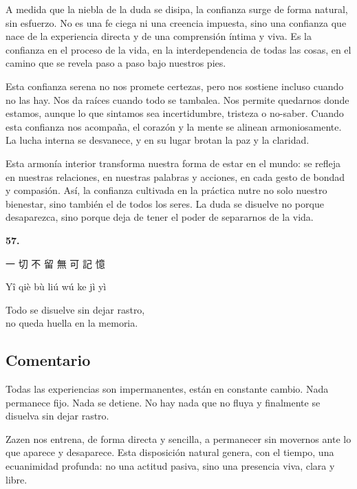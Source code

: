 \documentclass[
  a5paperpaper,
]{article}
\begin{document}
A medida que la niebla de la duda se disipa, la confianza surge de forma
natural, sin esfuerzo. No es una fe ciega ni una creencia impuesta, sino
una confianza que nace de la experiencia directa y de una comprensión
íntima y viva. Es la confianza en el proceso de la vida, en la
interdependencia de todas las cosas, en el camino que se revela paso a
paso bajo nuestros pies.

Esta confianza serena no nos promete certezas, pero nos sostiene incluso
cuando no las hay. Nos da raíces cuando todo se tambalea. Nos permite
quedarnos donde estamos, aunque lo que sintamos sea incertidumbre,
tristeza o no-saber. Cuando esta confianza nos acompaña, el corazón y la
mente se alinean armoniosamente. La lucha interna se desvanece, y en su
lugar brotan la paz y la claridad.

Esta armonía interior transforma nuestra forma de estar en el mundo: se
refleja en nuestras relaciones, en nuestras palabras y acciones, en cada
gesto de bondad y compasión. Así, la confianza cultivada en la práctica
nutre no solo nuestro bienestar, sino también el de todos los seres. La
duda se disuelve no porque desaparezca, sino porque deja de tener el
poder de separarnos de la vida.

\hfill\break

\hypertarget{02}{}
\begin{verseblock}

\newpage

\begin{center}\textbf{57.}\end{center}

一 切 不 留 無 可 記 憶

Yî qiè bù liú wú ke jì yì

Todo se disuelve sin dejar rastro,\\
no queda huella en la memoria.

\end{verseblock}

\hfill\break

\hypertarget{comentario-56}{%
\subsection{Comentario}\label{comentario-56}}

Todas las experiencias son impermanentes, están en constante cambio.
Nada permanece fijo. Nada se detiene. No hay nada que no fluya y
finalmente se disuelva sin dejar rastro.

Zazen nos entrena, de forma directa y sencilla, a permanecer sin
movernos ante lo que aparece y desaparece. Esta disposición natural
genera, con el tiempo, una ecuanimidad profunda: no una actitud pasiva,
sino una presencia viva, clara y libre.
\end{document}
